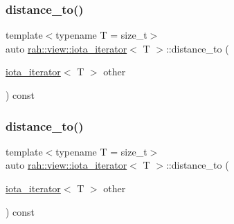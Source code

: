 \mbox{\label{structrah_1_1view_1_1iota__iterator_a3662abe8721e4c5c7bbc4214e36c4920}} 
\subsubsection{\texorpdfstring{distance\_to()}{distance\_to()}\hspace{0.1cm}{\footnotesize\ttfamily [1/2]}}
{\footnotesize\ttfamily template$<$typename T  = size\+\_\+t$>$ \\
auto \mbox{\hyperlink{structrah_1_1view_1_1iota__iterator}{rah\+::view\+::iota\+\_\+iterator}}$<$ T $>$\+::distance\+\_\+to (\begin{DoxyParamCaption}\item[{\mbox{\hyperlink{structrah_1_1view_1_1iota__iterator}{iota\+\_\+iterator}}$<$ T $>$}]{other }\end{DoxyParamCaption}) const\hspace{0.3cm}{\ttfamily [inline]}}

\mbox{\label{structrah_1_1view_1_1iota__iterator_a3662abe8721e4c5c7bbc4214e36c4920}} 
\subsubsection{\texorpdfstring{distance\_to()}{distance\_to()}\hspace{0.1cm}{\footnotesize\ttfamily [2/2]}}
{\footnotesize\ttfamily template$<$typename T  = size\+\_\+t$>$ \\
auto \mbox{\hyperlink{structrah_1_1view_1_1iota__iterator}{rah\+::view\+::iota\+\_\+iterator}}$<$ T $>$\+::distance\+\_\+to (\begin{DoxyParamCaption}\item[{\mbox{\hyperlink{structrah_1_1view_1_1iota__iterator}{iota\+\_\+iterator}}$<$ T $>$}]{other }\end{DoxyParamCaption}) const\hspace{0.3cm}{\ttfamily [inline]}}

